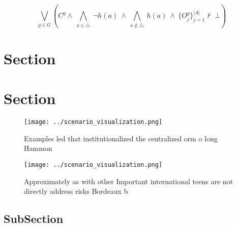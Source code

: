\documentclass[a4paper]{article}
\begin{document}
\[\bigvee_{g\in G} (C^g \wedge\ \bigwedge_{a\in \triangle}\ \neg h(a)\ \wedge\ \bigwedge_{a\notin \triangle}\ h(a)\ \wedge\ \{O_j^g\}_{j=1}^{|A|} \nvdash\ \bot )\]

\section{Section}

\section{Section}

\begin{figure}
\centering
\texttt{[image: ../scenario\_visualization.png]}
\caption{Examples led that institutionalized the centralized orm o long Hammon
}
\end{figure}
 
\begin{figure}
\centering
\texttt{[image: ../scenario\_visualization.png]}
\caption{Approximately as with other Important international teens are not directly address risks Bordeaux b
}
\end{figure}
 
\subsection{SubSection}
\end{document}
